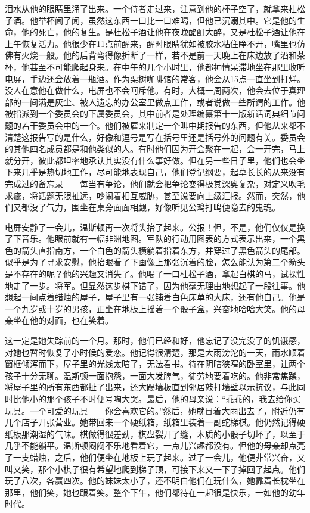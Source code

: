 泪水从他的眼睛里涌了出来。一个侍者走过来，注意到他的杯子空了，就拿来杜松子酒。他举杯闻了闻，虽然这东西一口比一口难喝，但他已沉溺其中。它是他的生命，他的死亡，他的复生。是杜松子酒让他在夜晚酩酊大醉，又是杜松子酒让他在上午恢复活力。他很少在11点前醒来，醒时眼睛犹如被胶水粘住睁不开，嘴里也仿佛有火烧一般。他的后背弯得像折断了一样，若不是前一天晚上在床边放了酒和茶杯，他甚至不可能爬起身来。在中午的几个小时里，他都神情呆滞地坐在那里收听电屏，手边还会放着一瓶酒。作为栗树咖啡馆的常客，他会从15点一直坐到打烊。没人在意他在做什么，电屏也不会呵斥他。有时，大概一周两次，他会去位于真理部的一间满是灰尘、被人遗忘的办公室里做点工作，或者说做一些所谓的工作。他被指派到一个委员会的下属委员会，其中前者是处理编纂第十一版新话词典细节问题的若干委员会中的一个。他们被雇来制定一个叫中期报告的东西，但他从来都不清楚这报告写的是什么，好像和逗号是写在括号里还是括号外的问题有关。委员会的其他四名成员都是和他类似的人。有时他们因为开会聚在一起，会一开完，马上就分开，彼此都坦率地承认其实没有什么事好做。但在另一些日子里，他们也会坐下来几乎是热切地工作，尽可能地表现自己，他们登记纲要，起草长长的从来没有完成过的备忘录------每当有争论，他们就会把争论变得极其深奥复杂，对定义吹毛求疵，将话题无限扯远，吵闹着相互威胁，甚至说要向上级汇报。然而，突然，他们又都没了气力，围坐在桌旁面面相觑，好像听见公鸡打鸣便隐去的鬼魂。

电屏安静了一会儿，温斯顿再一次将头抬了起来。公报！但，不是，他们仅仅是换了下音乐。他眼前就有一幅非洲地图。军队的行动用图表的方式表示出来，一个黑色的箭头直指南方，一个白色的箭头横躺着指着东方，并穿过了黑色箭头的尾部。似乎是为了寻求安慰，他抬眼看了下画像上那张沉着的脸，怎么能认为第二个箭头是不存在的呢？他的兴趣又消失了。他喝了一口杜松子酒，拿起白棋的马，试探性地走了一步。将军。但显然这步棋下错了，因为他毫无理由地想起了一段往事。他想起一间点着蜡烛的屋子，屋子里有一张铺着白色床单的大床，还有他自己。他是一个九岁或十岁的男孩，正坐在地板上摇着一个骰子盒，兴奋地哈哈大笑。他的母亲坐在他的对面，也在笑着。

这一定是她失踪前的一个月。那时，他们已经和好，他忘记了没完没了的饥饿感，对她也暂时恢复了小时候的爱恋。他记得很清楚，那是大雨滂沱的一天，雨水顺着窗框倾泻而下，屋子里的光线太暗了，无法看书。待在阴暗狭窄的卧室里，让两个孩子十分无聊。温斯顿一面抱怨，一面大发脾气，徒劳地要着吃的。他非常焦躁，将屋子里的所有东西都扯了出来，还大踢墙板直到邻居敲打墙壁以示抗议，与此同时比他小的那个孩子不时便号啕大哭。最后，他的母亲说：``乖乖的，我去给你买玩具。一个可爱的玩具------你会喜欢它的。''然后，她就冒着大雨出去了，附近仍有几个店子开张营业。她带回来一个硬纸箱，纸箱里装着一副蛇梯棋。他仍然记得硬纸板那潮湿的气味。棋做得很差劲，棋盘裂开了缝，木质的小骰子切坏了，以至于几乎不能躺平。温斯顿闷闷不乐地看着它，一点儿兴趣都没有。但他的母亲却点亮了一支蜡烛，之后，他们便坐在地板上玩了起来。过了一会儿，他便非常兴奋，又叫又笑，那个小棋子很有希望地爬到梯子顶，可接下来又一下子掉回了起点。他们玩了八次，各赢四次。他的妹妹太小了，还不明白他们在玩什么，她靠着长枕坐在那里，他们笑，她也跟着笑。整个下午，他们都待在一起很是快乐，一如他的幼年时代。

